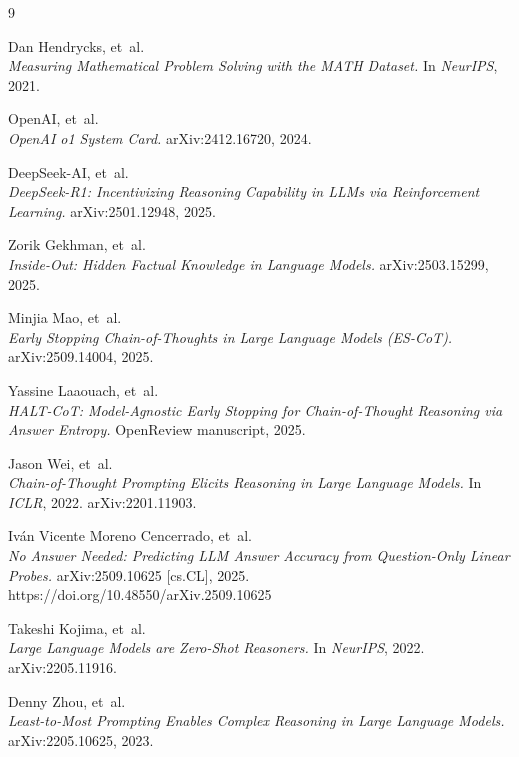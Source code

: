 \documentclass[10pt,a4paper,twocolumn]{article}
\begin{document}
\begingroup
\small
\begin{thebibliography}{9}

Dan Hendrycks, et~al. \\ 
\textit{Measuring Mathematical Problem Solving with the MATH Dataset.} 
In \textit{NeurIPS}, 2021.

OpenAI, et~al. \\ 
\textit{OpenAI o1 System Card.} 
arXiv:2412.16720, 2024.

DeepSeek-AI, et~al. \\ 
\textit{DeepSeek-R1: Incentivizing Reasoning Capability in LLMs via Reinforcement Learning.} 
arXiv:2501.12948, 2025.

Zorik Gekhman, et~al. \\ 
\textit{Inside-Out: Hidden Factual Knowledge in Language Models.} 
arXiv:2503.15299, 2025.

Minjia Mao, et~al. \\ 
\textit{Early Stopping Chain-of-Thoughts in Large Language Models (ES-CoT).} 
arXiv:2509.14004, 2025.

Yassine Laaouach, et~al. \\ 
\textit{HALT-CoT: Model-Agnostic Early Stopping for Chain-of-Thought Reasoning via Answer Entropy.} 
OpenReview manuscript, 2025.

Jason Wei, et~al. \\ 
\textit{Chain-of-Thought Prompting Elicits Reasoning in Large Language Models.} 
In \textit{ICLR}, 2022. arXiv:2201.11903.

Iván Vicente Moreno Cencerrado, et~al. \\ 
\textit{No Answer Needed: Predicting LLM Answer Accuracy from Question-Only Linear Probes.} 
arXiv:2509.10625 [cs.CL], 2025. https://doi.org/10.48550/arXiv.2509.10625

Takeshi Kojima, et~al. \\ 
\textit{Large Language Models are Zero-Shot Reasoners.} 
In \textit{NeurIPS}, 2022. arXiv:2205.11916.

Denny Zhou, et~al. \\ 
\textit{Least-to-Most Prompting Enables Complex Reasoning in Large Language Models.} 
arXiv:2205.10625, 2023.



\end{thebibliography}

\endgroup
\end{document}

